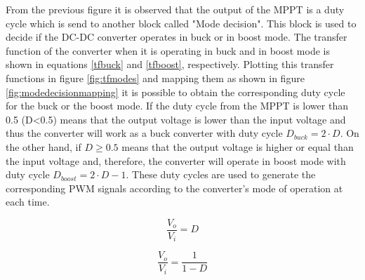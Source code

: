 From the previous figure it is observed that the output of the MPPT is a duty cycle which is send to another block called "Mode decision". This block is used to decide if the DC-DC converter operates in buck or in boost mode. The transfer function of the converter when it is operating in buck and in boost mode is shown in equations \ref{tfbuck} and \ref{tfboost}, respectively. Plotting this transfer functions in figure \ref{fig:tfmodes} and mapping them as shown in figure \ref{fig:modedecisionmapping} it is possible to obtain the corresponding duty cycle for the buck or the boost mode. If the duty cycle from the MPPT is lower than 0.5 (D<0.5) means that the output voltage is lower than the input voltage and thus the converter will work as a buck converter with duty cycle $D_{buck}=2\cdot D$. On the other hand, if $D \geq 0.5$ means that the output voltage is higher or equal than the input voltage and, therefore, the converter will operate in boost mode with duty cycle $D_{boost}=2\cdot D - 1$. These duty cycles are used to generate the corresponding PWM signals according to the converter's mode of operation at each time. 

\vspace{1cm}
\begin{minipage}{0.3\linewidth}
	\begin{equation}
	\frac{V_o}{V_i} = D
	\end{equation}
	\label{tfbuck}
\end{minipage}%
\begin{minipage}{0.5\linewidth}
	\begin{equation}
	\frac{V_o}{V_i}= \frac{1}{1-D}
	\end{equation}
	\label{tfboost}
\end{minipage}

